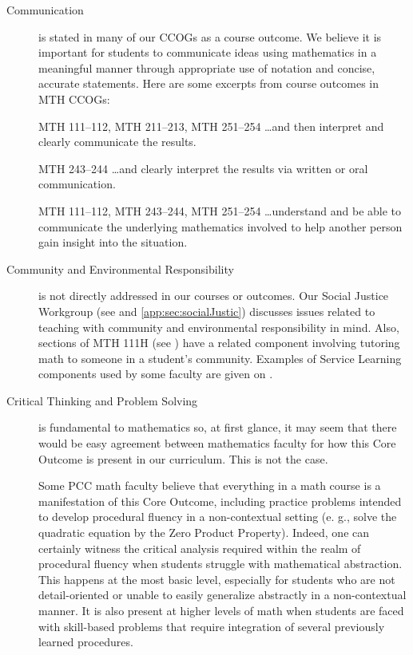 \begin{description}
	\item[Communication] is stated in many of our CCOGs as a course outcome.
		We believe it is important for students to communicate ideas using mathematics in a meaningful manner through appropriate use of notation and concise, accurate statements.
		Here are some excerpts from course outcomes in MTH CCOGs: \begin{aquote}{MTH 111--112, MTH 211--213, MTH 251--254} {\ldots}and then interpret and clearly communicate the results.
		\end{aquote}

		\begin{aquote}{MTH 243--244}
			{\ldots}and clearly interpret the results via written or oral communication.
		\end{aquote}

		\begin{aquote}{MTH 111--112, MTH 243--244, MTH 251--254}
			{\ldots}understand and be able to communicate the underlying mathematics
			involved to help another person gain insight into the situation.
		\end{aquote}

	\item[Community and Environmental Responsibility] is not directly addressed in
		our courses or outcomes.
		Our Social Justice Workgroup (see  and \vref{app:sec:socialJustic}) discusses issues related to teaching with community and environmental responsibility in mind.
		Also, sections of MTH 111H (see ) have a related component involving tutoring math to someone in a student's community.
		Examples of Service Learning components used by some faculty are given on .

	\item[Critical Thinking and Problem Solving]
		is fundamental to mathematics so, at first glance, it may seem that there would
		be easy agreement between mathematics faculty for how this Core Outcome is
		present in our curriculum.
		This is not the case.

		Some PCC math faculty believe that everything in a math course is a manifestation of this Core Outcome, including practice problems intended to develop procedural fluency in a non-contextual setting (e.
		g., solve the quadratic
		equation by the Zero Product Property).
		Indeed, one can certainly witness the critical analysis required within the realm of procedural fluency when students struggle with  mathematical abstraction.
		This happens at the most basic level, especially for students who are not detail-oriented or unable to easily generalize abstractly in a non-contextual manner.
		It is also present at higher levels of math when students are faced with skill-based problems that require integration of several previously learned procedures.


\end{description}
